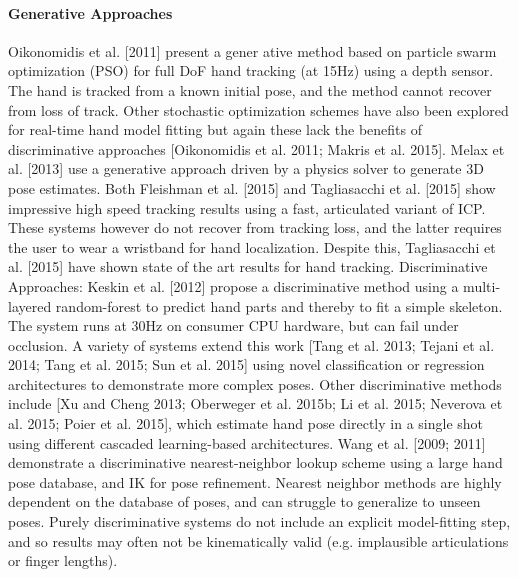 \begin{DRAFT}
\paragraph{Generative Approaches} 
Oikonomidis et al. [2011] present a gener ative method based on particle swarm optimization (PSO) for full DoF hand tracking (at 15Hz) using a depth sensor. The hand is tracked from a known initial pose, and the method cannot recover from loss of track. Other stochastic optimization schemes have also been explored for real-time hand model fitting but again these lack the benefits of discriminative approaches [Oikonomidis et al. 2011; Makris et al. 2015]. Melax et al. [2013] use a generative approach driven by a physics solver to generate 3D pose estimates. Both Fleishman et al. [2015] and Tagliasacchi et al. [2015] show impressive high speed tracking results using a fast, articulated variant of ICP. These systems however do not recover from tracking loss, and the latter requires the user to wear a wristband for hand localization. Despite this, Tagliasacchi et al. [2015] have shown state of the art results for hand tracking. Discriminative Approaches: Keskin et al. [2012] propose a discriminative method using a multi-layered random-forest to predict hand parts and thereby to fit a simple skeleton. The system runs at 30Hz on consumer CPU hardware, but can fail under occlusion. A variety of systems extend this work [Tang et al. 2013; Tejani et al. 2014; Tang et al. 2015; Sun et al. 2015] using novel classification or regression architectures to demonstrate more complex poses. Other discriminative methods include [Xu and Cheng 2013; Oberweger et al. 2015b; Li et al. 2015; Neverova et al. 2015; Poier et al. 2015], which estimate hand pose directly in a single shot using different cascaded learning-based architectures. Wang et al. [2009; 2011] demonstrate a discriminative nearest-neighbor lookup scheme using a large hand pose database, and IK for pose refinement. Nearest neighbor methods are highly dependent on the database of poses, and can struggle to generalize to unseen poses. Purely discriminative systems do not include an explicit model-fitting step, and so results may often not be kinematically valid (e.g. implausible articulations or finger lengths).


\end{DRAFT}
